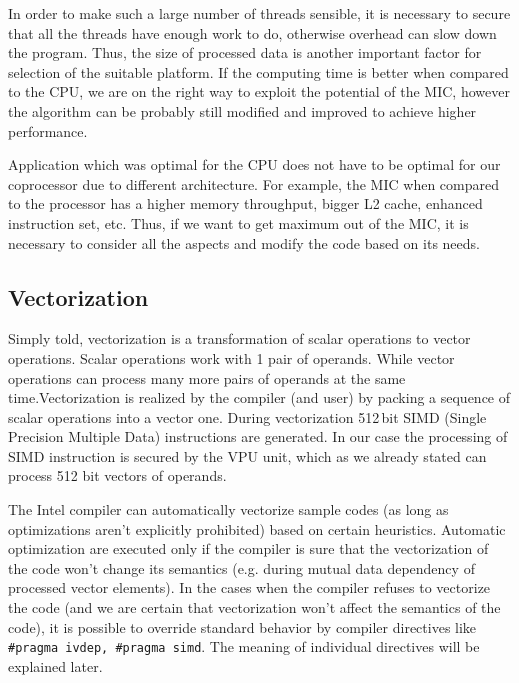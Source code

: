 \par In order to make such a large number of threads sensible, it is necessary to secure that all the threads have enough work to do, otherwise overhead can slow down the program. Thus, the size of processed data is another important factor for selection of the suitable platform. If the computing time is better when compared to the CPU, we are on the right way to exploit the potential of the MIC, however the algorithm can be probably still modified and improved to achieve higher performance.

\par Application which was optimal for the CPU does not have to be optimal for our coprocessor due to different architecture. For example, the MIC when compared to the processor has a higher memory throughput, bigger L2 cache, enhanced instruction set, etc. Thus, if we want to get maximum out of the MIC, it is necessary to consider all the aspects and modify the code based on its needs. 

\subsection{Vectorization}
Simply told, vectorization is a transformation of scalar operations to vector operations. Scalar operations work with 1 pair of operands. While vector operations can process many more pairs of operands at the same time.Vectorization is realized by the compiler (and user) by packing a sequence of scalar operations into a vector one. During vectorization 512\,bit SIMD (Single Precision Multiple Data) instructions are generated. In our case the processing of SIMD instruction is secured by the VPU unit, which as we already stated can process 512 bit vectors of operands.

\par The Intel compiler can automatically vectorize sample codes (as long as optimizations aren't explicitly prohibited) based on certain heuristics. Automatic optimization are executed only if the compiler is sure that the vectorization of the code won't change its semantics (e.g. during mutual data dependency of processed vector elements). In the cases when the compiler refuses to vectorize the code (and we are certain that vectorization won't affect the semantics of the code), it is possible to override standard behavior by compiler directives like \texttt{\#pragma ivdep, \#pragma simd}. The meaning of individual directives will be explained later.

